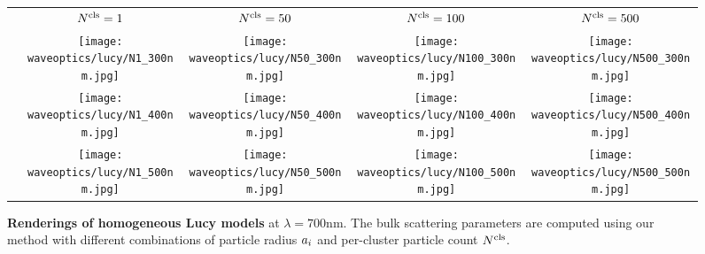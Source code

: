 \begin{figure}[h!]
    \centering
    \setlength{\resLen}{2.55in}
    \setlength{\raiseLen}{1.3in}
    \addtolength{\tabcolsep}{-3.5pt}
    \begin{tabular}{ccccc}
		& ${N^\text{cls}}=1$ & ${N^\text{cls}}=50$ & ${N^\text{cls}}=100$ & ${N^\text{cls}}=500$
		\\
		\raisebox{\raiseLen}{\rotatebox[origin=c]{90}{$\radius_i=300\text{nm}$}} &
		\texttt{[image: waveoptics/lucy/N1\_300nm.jpg]} &
		\texttt{[image: waveoptics/lucy/N50\_300nm.jpg]} &
		\texttt{[image: waveoptics/lucy/N100\_300nm.jpg]} &
		\texttt{[image: waveoptics/lucy/N500\_300nm.jpg]}
		\\
		\raisebox{\raiseLen}{\rotatebox[origin=c]{90}{$\radius_i=400\text{nm}$}} &
		\texttt{[image: waveoptics/lucy/N1\_400nm.jpg]} &
		\texttt{[image: waveoptics/lucy/N50\_400nm.jpg]} &
		\texttt{[image: waveoptics/lucy/N100\_400nm.jpg]} &
		\texttt{[image: waveoptics/lucy/N500\_400nm.jpg]}
		\\
		\raisebox{\raiseLen}{\rotatebox[origin=c]{90}{$\radius_i=500\text{nm}$}} &
		\texttt{[image: waveoptics/lucy/N1\_500nm.jpg]} &
		\texttt{[image: waveoptics/lucy/N50\_500nm.jpg]} &
		\texttt{[image: waveoptics/lucy/N100\_500nm.jpg]} &
		\texttt{[image: waveoptics/lucy/N500\_500nm.jpg]} \\ [-10pt]
	\end{tabular}
    \caption[Renderings of homogeneous Lucy models]{\label{fig:waveoptics:lucycompare}
        \textbf{Renderings of homogeneous Lucy models} at $\lambda = 700\text{nm}$.
        The bulk scattering parameters are computed using our method with different combinations of particle radius $a_i$ and per-cluster particle count ${N^\text{cls}}$.
    }
\end{figure}
